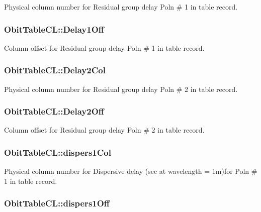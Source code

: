 Physical column number for Residual group delay Poln \# 1 in table record. 

\subsubsection{ {\bf Obit\-Table\-CL::Delay1Off}}\label{structObitTableCL_o59}


Column offset for Residual group delay Poln \# 1 in table record. 

\subsubsection{ {\bf Obit\-Table\-CL::Delay2Col}}\label{structObitTableCL_o82}


Physical column number for Residual group delay Poln \# 2 in table record. 

\subsubsection{ {\bf Obit\-Table\-CL::Delay2Off}}\label{structObitTableCL_o81}


Column offset for Residual group delay Poln \# 2 in table record. 

\subsubsection{ {\bf Obit\-Table\-CL::dispers1Col}}\label{structObitTableCL_o50}


Physical column number for Dispersive delay (sec at wavelength = 1m)for Poln \# 1 in table record. 

\subsubsection{ {\bf Obit\-Table\-CL::dispers1Off}}\label{structObitTableCL_o49}


